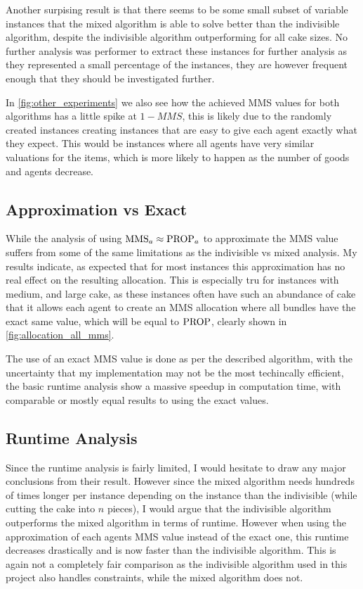 Another surpising result is that there seems to be some small subset of variable instances that the mixed algorithm is able to solve better than the indivisible algorithm, despite the indivisible algorithm outperforming for all cake sizes. No further analysis was performer to extract these instances for further analysis as they represented a small percentage of the instances, they are however frequent enough that they should be investigated further. 

In \autoref{fig:other_experiments} we also see how the achieved MMS values for both algorithms has a little spike at $1-MMS$, this is likely due to the randomly created instances creating instances that are easy to give each agent exactly what they expect. This would be instances where all agents have very similar valuations for the items, which is more likely to happen as the number of goods and agents decrease. 



\subsection{Approximation vs Exact}
While the analysis of using $\text{MMS}_a\approx\text{PROP}_a$ to approximate the MMS value suffers from some of the same limitations as the indivisible vs mixed analysis. My results indicate, as expected that for most instances this approximation has no real effect on the resulting allocation. This is especially tru for instances with medium, and large cake, as these instances often have such an abundance of cake that it allows each agent to create an MMS allocation where all bundles have the exact same value, which will be equal to $\text{PROP}$, clearly shown in \autoref{fig:allocation_all_mms}.

The use of an exact MMS value is done as per the described algorithm\cite{mms}, with the uncertainty that my implementation may not be the most techincally efficient, the basic runtime analysis show a massive speedup in computation time, with comparable or mostly equal results to using the exact values.


\subsection{Runtime Analysis}
Since the runtime analysis is fairly limited, I would hesitate to draw any major conclusions from their result. However since the mixed algorithm needs hundreds of times longer per instance depending on the instance than the indivisible (while cutting the cake into $n$ pieces), I would argue that the indivisible algorithm outperforms the mixed algorithm in terms of runtime. However when using the approximation of each agents MMS value instead of the exact one, this runtime decreases drastically and is now faster than the indivisible algorithm. This is again not a completely fair comparison as the indivisible algorithm used in this project also handles constraints, while the mixed algorithm does not.